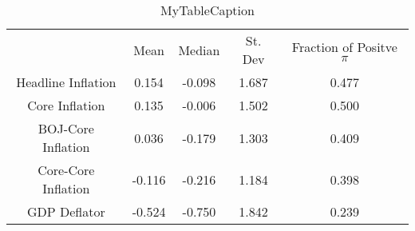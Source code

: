 \documentclass[10pt]{article}
\begin{document}
\begin{table}
\centering
\begin{tabular}{ccccc}
 & Mean & Median & St. Dev & Fraction of Positve $\pi$ \\
Headline Inflation & 0.154 & -0.098 & 1.687 & 0.477 \\
Core Inflation & 0.135 & -0.006 & 1.502 & 0.500 \\
BOJ-Core Inflation & 0.036 & -0.179 & 1.303 & 0.409 \\
Core-Core Inflation & -0.116 & -0.216 & 1.184 & 0.398 \\
GDP Deflator & -0.524 & -0.750 & 1.842 & 0.239 \\
\end{tabular}
\caption{MyTableCaption}
\label{table:MyTableLabel}
\end{table}
\end{document}
